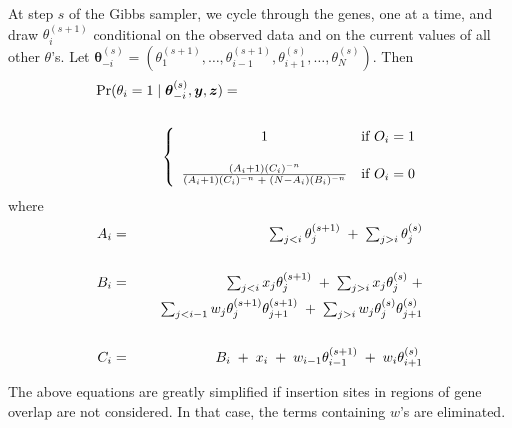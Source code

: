 \documentclass[letterpaper]{article}
\begin{document}
\begin{multicols}{2}
At step $s$ of the Gibbs sampler, we cycle through the genes, one at a
time, and draw $\theta_i^{(s+1)}$ conditional on the observed data and
on the current values of all other $\theta$'s.  Let
$\boldsymbol{\theta}_{-i}^{(s)} = (\theta_1^{(s+1)}, \dots,
\theta_{i-1}^{(s+1)}, \theta_{i+1}^{(s)}, \dots, \theta_N^{(s)})$.
Then
\begin{eqnarray*}
\lefteqn{\textstyle{\Pr(\theta_i = 1 \; | \; \boldsymbol{\theta}_{-i}^{(s)},
\boldsymbol{y}, \boldsymbol{z}) = }} \\ \\
&& \hspace{1.31cm} \left\{ \begin{array}{cl}
1 & \text{if } O_i = 1 \\ \\
\frac{(A_i + 1) (C_i)^{-n}}{(A_i+1) (C_i)^{-n} \; + \; (N - A_i) (B_i)^{-n}}
 & \text{if } O_i = 0
\end{array} \right. 
\end{eqnarray*}
where 
\begin{eqnarray*}
\textstyle{A_i} & = & \textstyle{\sum_{j < i} \theta_j^{(s+1)} \; + \;
\sum_{j>i}
\theta_j^{(s)}} \\ \\
\textstyle{B_i} & = & \textstyle{\sum_{j < i} x_j \theta_j^{(s+1)} \;
+ \; \sum_{j
> i} x_j \theta_j^{(s)} \; +} \\
&& \hspace{0.5cm} \textstyle{\sum_{j < i-1} w_j \theta_j^{(s+1)}
\theta_{j+1}^{(s+1)} \; + \; \sum_{j > i} w_j \theta_j^{(s)}
\theta_{j+1}^{(s)}} \\ \\
\textstyle{C_i} & = & \textstyle{B_i \; + \; x_i \; + \; w_{i-1}
\theta_{i-1}^{(s+1)} \; + \; w_i \theta_{i+1}^{(s)}}
\end{eqnarray*}

The above equations are greatly simplified if insertion sites in
regions of gene overlap are not considered.  In that case, the terms
containing $w$'s are eliminated.


\end{multicols}
\end{document}
